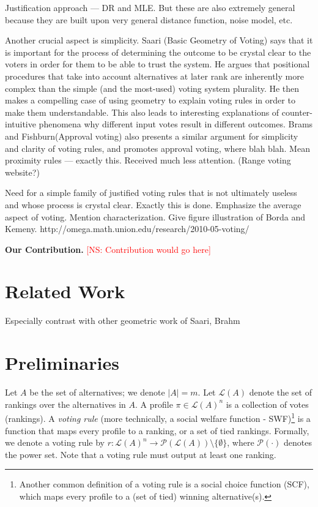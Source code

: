 \documentclass[prodmode,acmec]{ec-acmsmall}
\newcommand{\calL}{{\mathcal{L}}}
\newcommand{\rank}{{\calL(A)}}
\newcommand{\calP}{{\mathcal{P}}}
\newcommand{\kibitz}[2]{\ifnum\Comments=1\textcolor{#1}{#2}\fi}
\newcommand{\ns}[1]{\kibitz{red} {[NS: #1]}}
\begin{document}
Justification approach --- DR and MLE. But these are also extremely general because they are built upon very general distance function, noise model, etc. 

Another crucial aspect is simplicity. Saari (Basic Geometry of Voting) says that it is important for the process of determining the outcome to be crystal clear to the voters in order for them to be able to trust the system. He argues that positional procedures that take into account alternatives at later rank are inherently more complex than the simple (and the most-used) voting system plurality. He then makes a compelling case of using geometry to explain voting rules in order to make them understandable. This also leads to interesting explanations of counter-intuitive phenomena why different input votes result in different outcomes. Brams and Fishburn(Approval voting) also presents a similar argument for simplicity and clarity of voting rules, and promotes approval voting, where blah blah. Mean proximity rules --- exactly this. Received much less attention. (Range voting website?)

Need for a simple family of justified voting rules that is not ultimately useless and whose process is crystal clear. Exactly this is done. 
Emphasize the average aspect of voting. Mention characterization. Give figure illustration of Borda and Kemeny.
http://omega.math.union.edu/research/2010-05-voting/

\noindent \textbf{Our Contribution.} \ns{Contribution would go here}

\section{Related Work}
Especially contrast with other geometric work of Saari, Brahm 




\section{Preliminaries}
\label{sec:prelim}
Let $A$ be the set of alternatives; we denote $|A| = m$. Let $\rank$ denote the set of rankings over the alternatives in $A$. A profile $\pi \in \rank^n$ is a collection of votes (rankings). A \emph{voting rule} (more technically, a social welfare function - SWF)\footnote{Another common definition of a voting rule is a social choice function (SCF), which maps every profile to a (set of tied) winning alternative(s).} is a function that maps every profile to a ranking, or a set of tied rankings. Formally, we denote a voting rule by $r : \rank^n \rightarrow \calP(\rank)\setminus\{\emptyset\}$, where $\calP(\cdot)$ denotes the power set. Note that a voting rule must output at least one ranking. \\
\end{document}
